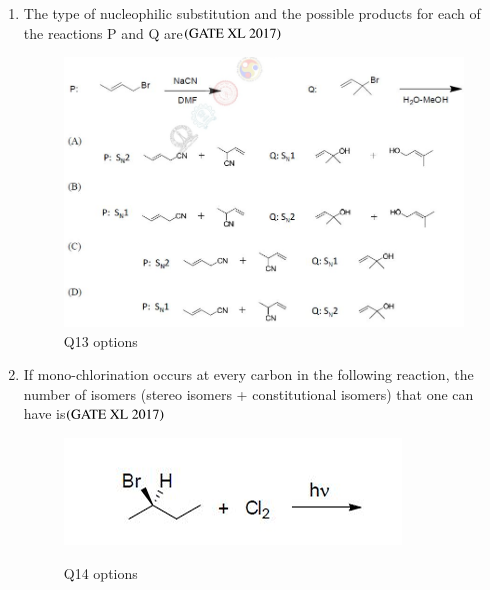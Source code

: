 \documentclass[journal]{IEEEtran}
\begin{document}
\begin{enumerate}
\item The type of nucleophilic substitution and the possible products for each of the reactions P and Q are\hfill $\left(\text{GATE XL 2017}\right)$
\begin{figure}[H]
    \centering
    \includegraphics[width=0.85\columnwidth]{figs/xl2017_q13_all_opts.png}
    \caption{Q13 options}
\end{figure}

\item If mono-chlorination occurs at every carbon in the following reaction, the number of isomers (stereo isomers + constitutional isomers) that one can have is\hfill $\left(\text{GATE XL 2017}\right)$
\begin{figure}[H]
    \centering
    \includegraphics[width=0.65\columnwidth]{figs/xl2017_q14.png}
    \label{fig:placeholder}
    \caption{Q14 options}
\end{figure}
\begin{enumerate}
\end{enumerate}


\end{enumerate}
\end{document}
